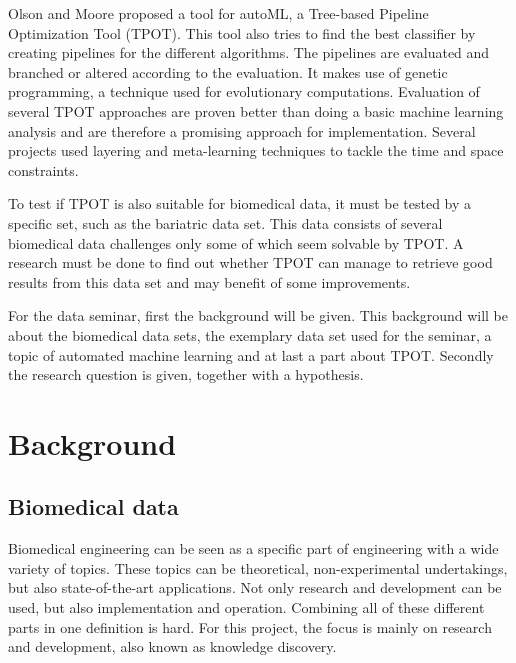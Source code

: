 \documentclass[10pt,a4paper]{article}
\begin{document}
	Olson and Moore proposed a tool for autoML, a Tree-based Pipeline Optimization Tool (TPOT).\cite{olson2016tpot} This tool also tries to find the best classifier by creating pipelines for the different algorithms. The pipelines are evaluated and branched or altered according to the evaluation. It makes use of genetic programming, a technique used for evolutionary computations.\cite{banzhaf1998genetic} Evaluation of several TPOT approaches are proven better than doing a basic machine learning analysis and are therefore a promising approach for implementation. \cite{olson2016evaluation} Several projects used layering and meta-learning techniques to tackle the time and space constraints.\cite{Gijsbers2017Thesis}
	
	To test if TPOT is also suitable for biomedical data, it must be tested by a specific set, such as the bariatric data set. This data consists of several biomedical data challenges only some of which seem solvable by TPOT. A research must be done to find out whether TPOT can manage to retrieve good results from this data set and may benefit of some improvements.
	
	For the data seminar, first the background will be given. This background will be about the biomedical data sets, the exemplary data set used for the seminar, a topic of automated machine learning and at last a part about TPOT. Secondly the research question is given, together with a hypothesis.
	
	\section{Background}
	\label{sec:Background}
	
	\subsection{Biomedical data}
	
	\label{subsec:BiomedicalData}
	
	Biomedical engineering can be seen as a specific part of engineering with a wide variety of topics. These topics can be theoretical, non-experimental undertakings, but also state-of-the-art applications. Not only research and development can be used, but also implementation and operation. Combining all of these different parts in one definition is hard. \cite{bronzino2014biomedical} For this project, the focus is mainly on research and development, also known as knowledge discovery. \cite{bramer2007principles} 
\end{document}
